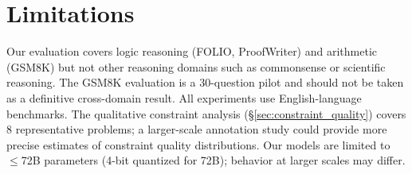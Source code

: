 \documentclass[11pt,a4paper]{article}
\begin{document}
\section*{Limitations}

Our evaluation covers logic reasoning (FOLIO, ProofWriter) and arithmetic (GSM8K) but not other reasoning domains such as commonsense or scientific reasoning.
The GSM8K evaluation is a 30-question pilot and should not be taken as a definitive cross-domain result.
All experiments use English-language benchmarks.
The qualitative constraint analysis (\S\ref{sec:constraint_quality}) covers 8 representative problems; a larger-scale annotation study could provide more precise estimates of constraint quality distributions.
Our models are limited to $\leq$72B parameters (4-bit quantized for 72B); behavior at larger scales may differ.
\end{document}
